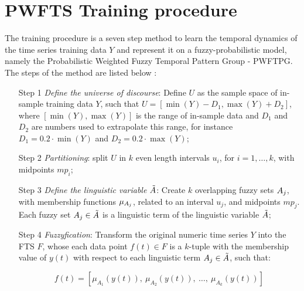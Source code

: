 \section{PWFTS Training procedure}
\label{sec:pwfts_training}

The training procedure is a seven step method to learn the temporal dynamics of the time series training data $Y$ and represent it on a fuzzy-probabilistic model, namely the Probabilistic Weighted Fuzzy Temporal Pattern Group - PWFTPG. The steps of the method are listed below :

\begin{enumerate}
\item[Step 1] \textit{Define the universe of discourse}: Define $U$ as the sample space of in-sample training data $Y$, such that $U = [\min(Y) - D_1, \max(Y)+D_2]$, where $[\min(Y), \max(Y)]$ is the range of in-sample data and $D_1$ and $D_2$ are numbers used to extrapolate this range, for instance $D_1 = 0.2\cdot\min(Y)$ and $D_2 = 0.2\cdot\max(Y)$;

\item[Step 2] \textit{Partitioning}: split $U$ in $k$ even length intervals $u_i$, for $i = 1,\ldots,k$, with midpoints $mp_i$;

\index{$\ulvar$}
\item[Step 3] \textit{Define the linguistic variable $\ulvar$}: Create $k$ overlapping fuzzy sets $A_j$, with membership functions $\mu_{A_j}$, related to an interval $u_j$, and midpoints $mp_j$. Each fuzzy set $A_j \in \tilde{A}$ is a linguistic term of the linguistic variable $\ulvar$;

\item[Step 4] \textit{Fuzzyfication}: Transform the original numeric time series $Y$ into the FTS $F$, whose each data point $f(t) \in F$ is a $k$-tuple with the membership value of $y(t)$ with respect to each linguistic term $A_j \in \tilde{A}$, such that:

\begin{equation}
f(t) = \left[\mu_{A_1}(y(t)),\ \mu_{A_2}(y(t)),\ \ldots,\ \mu_{A_k}(y(t)) \right]
\end{equation}


\end{enumerate}
